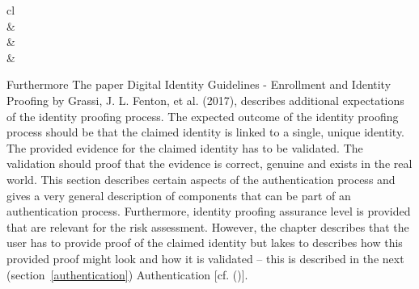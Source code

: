 \begin{table}[h]
	\centering
	\begingroup
	\setlength{\tabcolsep}{10pt} %
	\renewcommand{\arraystretch}{1.5} %
	\begin{tabular}{cl}
		\hline
		                                                                                                                                                                   \\ \hline
		 &    \\ \hline
		 &  \\ \hline
		 &                                             \\ \hline
	\end{tabular}
	\endgroup
	\caption{Identity Assurance Levels (\cite{NIST:2017:DIG}, p.18)} \label{tab:ial}
\end{table}

Furthermore The paper Digital Identity Guidelines - Enrollment and Identity Proofing by Grassi, J. L. Fenton, et al. (2017), describes additional expectations of the identity proofing process. The expected outcome of the identity proofing process should be that the claimed identity is linked to a single, unique identity. The provided evidence for the claimed identity has to be validated. The validation should proof that the evidence is correct, genuine and exists in the real world.
This section describes certain aspects of the authentication process and gives a very general description of components that can be part of an authentication process. Furthermore, identity proofing assurance level is provided that are relevant for the risk assessment. However, the chapter describes that the user has to provide proof of the claimed identity but lakes to describes how this provided proof might look and how it is validated – this is described in the next (section~\ref{authentication}) Authentication [cf. (\cite{NIST:2017:DIGEIP})].
	

